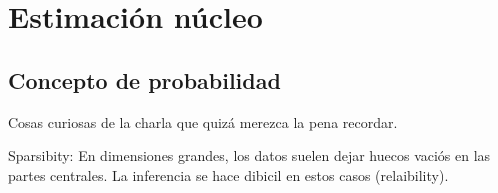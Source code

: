 \documentclass[MyPE.tex]{subfiles}
\begin{document}
\chapter{Estimación núcleo}
\section{Concepto de probabilidad}
Cosas curiosas de la charla que quizá merezca la pena recordar. 

Sparsibity: En dimensiones grandes, los datos suelen dejar huecos vaciós en las partes centrales. La inferencia se hace dibicil en estos casos (relaibility).
\end{document}
